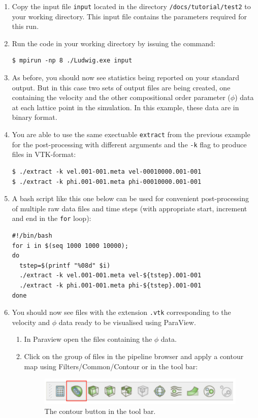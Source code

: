 \documentclass[11pt,twoside,a4paper]{article}
\begin{document}
\begin{enumerate}
\item Copy the input file \texttt{input} located in the directory 
\texttt{/docs/tutorial/test2} 
to your working directory. This input file contains the parameters required for this run. 
\item Run the code in your working directory by issuing the command:
\begin{lstlisting}
$ mpirun -np 8 ./Ludwig.exe input
\end{lstlisting}
\item As before, you should now see statistics being reported on your standard output. But 
in this case two sets of output files are being created, one containing the velocity and 
the other compositional order parameter ($\phi$) data at each lattice point in the simulation. 
In this example, these data are in binary format.
\item You are able to use the same exectuable \texttt{extract} from the previous 
example for the  post-processing with different arguments and the \texttt{-k} flag to produce
files in VTK-format:
\begin{lstlisting}
$ ./extract -k vel.001-001.meta vel-00010000.001-001
$ ./extract -k phi.001-001.meta phi-00010000.001-001
\end{lstlisting}
\item A bash script like this one below can be used for convenient post-processing of multiple 
raw data files and time steps (with appropriate start, increment and end in the \texttt{for} loop):
\begin{lstlisting}
#!/bin/bash
for i in $(seq 1000 1000 10000);
do
  tstep=$(printf "%08d" $i)
  ./extract -k vel.001-001.meta vel-${tstep}.001-001  
  ./extract -k phi.001-001.meta phi-${tstep}.001-001
done
\end{lstlisting}
\item You should now see files with the extension \texttt{.vtk} corresponding to the velocity 
and $\phi$ data ready to be visualised using ParaView.
\begin{enumerate}
\item In Paraview open the files containing the $\phi$ data.
\item Click on the group of files in the pipeline browser and apply a contour map using 
Filters/Common/Contour or in the tool bar: 

\begin{figure}[H]
\begin{center}
\includegraphics[width=0.8\linewidth]{contour.png}
  \caption{The contour button in the tool bar.}
  \label{fig:contour}
  \end{center}
\end{figure}


\end{enumerate}
\end{enumerate}
\end{document}
